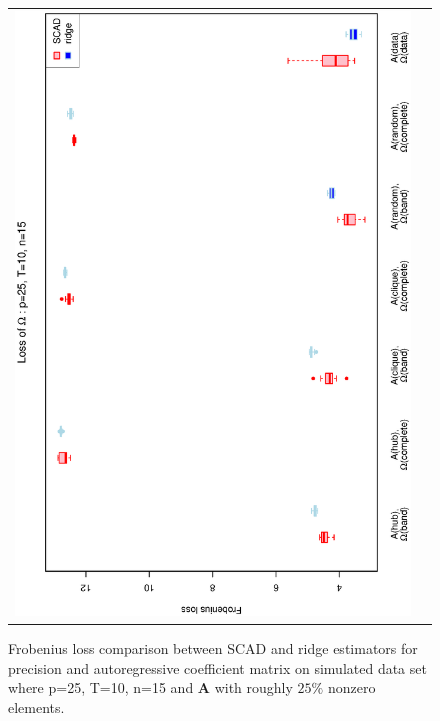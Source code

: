 \begin{figure}[h!]
\begin{tabular}{cc}
\includegraphics[scale=0.45,angle=270]{LossOmega25T10N15_25.eps}
\end{tabular}
\caption{Frobenius loss comparison between SCAD and ridge estimators for precision and autoregressive coefficient matrix on simulated data set where p=25, T=10, n=15 and $\mathbf{A}$ with roughly $25\%$ nonzero elements.}
\label{figSM:Loss25T10N15_25}
\end{figure}


